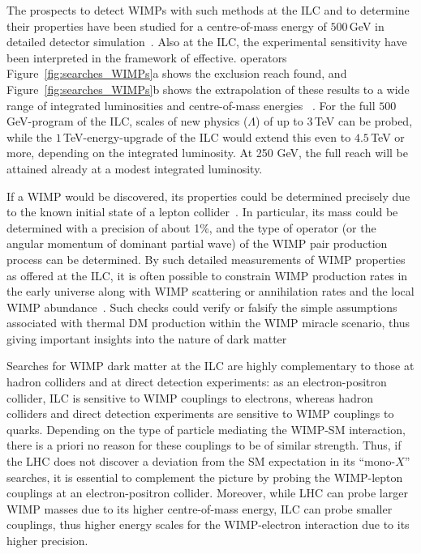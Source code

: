 The prospects to detect WIMPs with such methods at the ILC and to determine their properties 
have been studied
for a centre-of-mass energy of $500$\,GeV
in detailed detector simulation~\cite{Bartels:2012ex,Habermehl:417605}. 
Also at the ILC, the experimental sensitivity have been interpreted 
in the framework of effective.
operators
Figure~\ref{fig:searches_WIMPs}a shows the exclusion reach found, and 
Figure~\ref{fig:searches_WIMPs}b shows the extrapolation of these
results to a wide range of integrated luminosities and centre-of-mass energies 
~\cite{Habermehl:417605}.
For the full $500$\,GeV-program of the ILC, scales of new physics ($\Lambda$) 
of up to $3$\,TeV  can be probed,
while the $1$\,TeV-energy-upgrade of the ILC would extend this even 
to $4.5$\,TeV or more, 
depending on the integrated luminosity.
At 250 GeV, 
the full reach will be attained already at a modest integrated luminosity.

If a WIMP would be discovered, 
its properties could be determined precisely due to the known initial
state of a lepton collider~\cite{Bartels:2012ex}. 
In particular, 
its mass could be determined with a precision of about 1\%, and the type of operator 
(or the angular momentum of dominant partial wave) of the WIMP pair production 
process can be determined. 
By such detailed measurements of WIMP properties as offered at the ILC, 
it is often possible to constrain WIMP
production rates in the early universe along with WIMP scattering or annihilation
rates and the local WIMP abundance~\cite{Baltz:2006fm}. 
Such checks could verify or falsify the simple assumptions 
associated with thermal DM production within the WIMP miracle scenario, 
thus giving important insights into the nature of dark matter

Searches for WIMP dark matter at the ILC are highly complementary to those
at hadron colliders and at direct detection experiments: 
as an electron-positron collider, 
ILC is sensitive to WIMP couplings to electrons, 
whereas hadron colliders and direct detection experiments are sensitive to WIMP 
couplings to quarks. 
Depending on the
type of particle mediating the WIMP-SM interaction, 
there is a priori no reason for these couplings to be of similar strength.
Thus, 
if the LHC does not discover a deviation from the SM expectation 
in its ``mono-$X$'' searches, 
it is essential to complement the picture by probing 
the WIMP-lepton couplings at an electron-positron collider.
Moreover, 
while LHC can probe larger WIMP masses due to its higher centre-of-mass energy, 
ILC can probe smaller couplings, thus higher energy scales for the 
WIMP-electron interaction due to its higher precision. 


